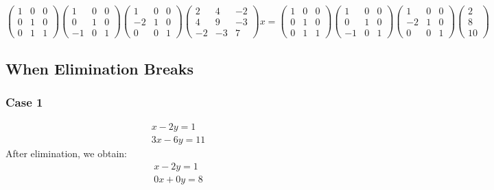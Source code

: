 \documentclass[12pt]{article}
\begin{document}
\begin{equation*}
\begin{pmatrix}
1&0&0\\
0&1&0\\
0&1&1
\end{pmatrix}
\begin{pmatrix}
1&0&0\\
0&1&0\\
-1&0&1 
\end{pmatrix}
\begin{pmatrix}
1&0&0\\
-2&1&0\\
0&0&1 
\end{pmatrix}
\begin{pmatrix}
2&4&-2\\
4&9&-3\\
-2&-3&7 
\end{pmatrix}
 x =
\begin{pmatrix}
1&0&0\\
0&1&0\\
0&1&1 
\end{pmatrix}
\begin{pmatrix}
1&0&0\\
0&1&0\\
-1&0&1 
\end{pmatrix}
\begin{pmatrix}
1&0&0\\
-2&1&0\\
0&0&1 
\end{pmatrix}
\begin{pmatrix}
2\\
8\\
10 
\end{pmatrix}
\end{equation*}

\subsection{When Elimination Breaks}
\subsubsection{Case 1}
\begin{align*}
x - 2y = 1\\
3x - 6y = 11
\end{align*}
After elimination, we obtain:
\begin{align*}
x - 2y = 1\\
0x + 0y = 8
\end{align*}
\end{document}
